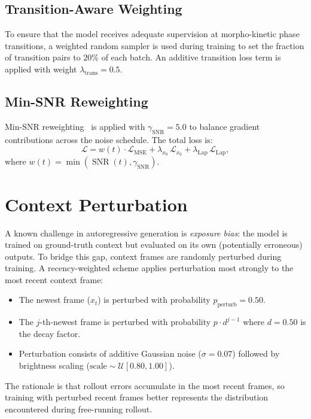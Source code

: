 \documentclass[12pt, a4paper, twoside]{report}
\newcommand{\calL}{\mathcal{L}}
\DeclareMathOperator{\SNR}{SNR}
\begin{document}
\subsection{Transition-Aware Weighting}
\label{ssec:transition_loss}

To ensure that the model receives adequate supervision at morpho-kinetic phase
transitions, a weighted random sampler is used during training to set the
fraction of transition pairs to $20\%$ of each batch.
An additive transition loss term is applied with weight
$\lambda_{\text{trans}} = 0.5$.

\subsection{Min-SNR Reweighting}
\label{ssec:minsnr}

Min-SNR reweighting~\cite{hang2023minsnr} is applied with
$\gamma_{\text{SNR}} = 5.0$ to balance gradient contributions across the noise
schedule.
The total loss is:
\begin{equation}
  \calL = w(t)\cdot\calL_{\text{MSE}}
        + \lambda_{x_0}\,\calL_{x_0}
        + \lambda_{\text{Lap}}\,\calL_{\text{Lap}},
  \label{eq:total_loss}
\end{equation}
where $w(t) = \min(\SNR(t), \gamma_{\text{SNR}})$.

\section{Context Perturbation}
\label{sec:ctx_perturbation}

A known challenge in autoregressive generation is \emph{exposure bias}: the
model is trained on ground-truth context but evaluated on its own
(potentially erroneous) outputs.
To bridge this gap, context frames are randomly perturbed during training.
A recency-weighted scheme applies perturbation most strongly to the most
recent context frame:
\begin{itemize}
  \item The newest frame ($x_t$) is perturbed with probability
        $p_{\text{perturb}} = 0.50$.
  \item The $j$-th-newest frame is perturbed with probability
        $p \cdot d^{j-1}$ where $d = 0.50$ is the decay factor.
  \item Perturbation consists of additive Gaussian noise
        ($\sigma = 0.07$) followed by brightness scaling
        ($\text{scale} \sim \mathcal{U}[0.80, 1.00]$).
\end{itemize}
The rationale is that rollout errors accumulate in the most recent frames,
so training with perturbed recent frames better represents the distribution
encountered during free-running rollout.
\end{document}
